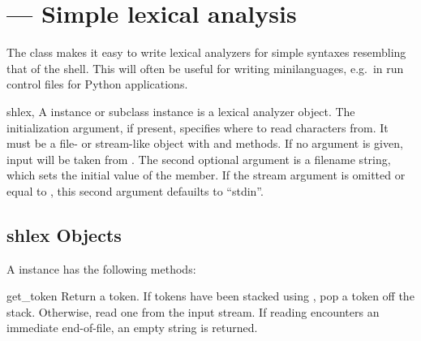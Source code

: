 \section{ ---
         Simple lexical analysis}



The  class makes it easy to write lexical analyzers for
simple syntaxes resembling that of the \UNIX{} shell.  This will often
be useful for writing minilanguages, e.g.\ in run control files for
Python applications.

\begin{classdesc}{shlex}{, }
A  instance or subclass instance is a lexical analyzer
object.  The initialization argument, if present, specifies where to
read characters from. It must be a file- or stream-like object with
 and  methods.  If no argument is given,
input will be taken from .  The second optional 
argument is a filename string, which sets the initial value of the
 member.  If the stream argument is omitted or
equal to , this second argument defauilts to ``stdin''.
\end{classdesc}


\begin{seealso}
\end{seealso}


\subsection{shlex Objects \label{shlex-objects}}

A  instance has the following methods:

\begin{methoddesc}{get_token}{}
Return a token.  If tokens have been stacked using
, pop a token off the stack.  Otherwise, read one
from the input stream.  If reading encounters an immediate
end-of-file, an empty string is returned. 
\end{methoddesc}

